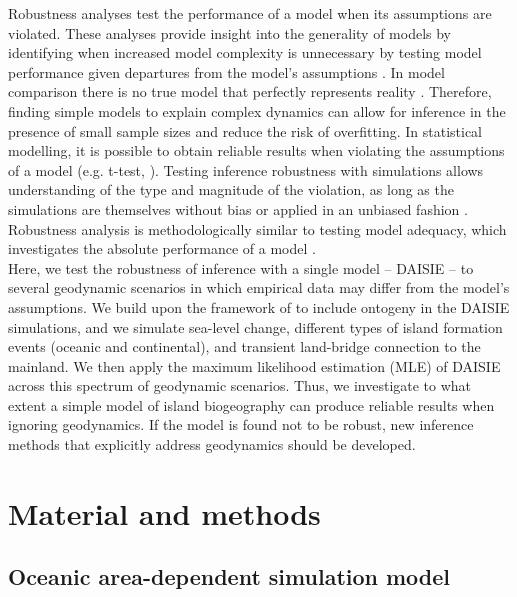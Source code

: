 \documentclass{article}
\begin{document}
Robustness analyses test the performance of a model when its assumptions are violated. These analyses provide insight into the generality of models by identifying when increased model complexity is unnecessary by testing model performance given departures from the model’s assumptions \citep{weisberg_robustness_2006, grimm_robustness_2016}. In model comparison there is no true model that perfectly represents reality \citep{burnham_model_2004}. Therefore, finding simple models to explain complex dynamics can allow for inference in the presence of small sample sizes and reduce the risk of overfitting. In statistical modelling, it is possible to obtain reliable results when violating the assumptions of a model (e.g. t-test, \cite{boneau_effects_1960}). Testing inference robustness with simulations allows understanding of the type and magnitude of the violation, as long as the simulations are themselves without bias or applied in an unbiased fashion \citep{huelsenbeck_performance_1995, hartmann_sampling_2010}. Robustness analysis is methodologically similar to testing model adequacy, which investigates the absolute performance of a model \citep{bollback_bayesian_2002, pennell_model_2015}. \\

Here, we test the robustness of inference with a single model – DAISIE – to several geodynamic scenarios in which empirical data may differ from the model’s assumptions. We build upon the framework of \cite{valente_effects_2014} to include ontogeny in the DAISIE simulations, and we simulate sea-level change, different types of island formation events (oceanic and continental), and transient land-bridge connection to the mainland. We then apply the maximum likelihood estimation (MLE) of DAISIE across this spectrum of geodynamic scenarios. Thus, we investigate to what extent a simple model of island biogeography can produce reliable results when ignoring geodynamics. If the model is found not to be robust, new inference methods that explicitly address geodynamics should be developed.

\clearpage

\section*{Material and methods}

\subsection*{Oceanic area-dependent simulation model}
\end{document}

